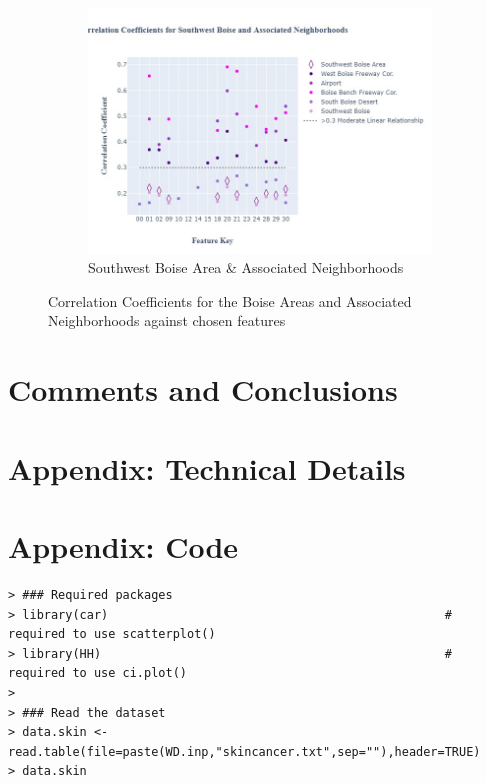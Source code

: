 \documentclass{article}
\begin{document}
\begin{figure}[H]
\begin{subfigure}[b]{0.45\textwidth}
         \includegraphics[width=\textwidth]{SW_fig.jpg}
         \caption{Southwest Boise Area \& Associated Neighborhoods}
         \label{fig: sw_ccg}
     \end{subfigure}
        \caption{Correlation Coefficients for the Boise Areas and Associated Neighborhoods against chosen features}
        \label{fig: all_ccg}
\end{figure}


\section{Comments and Conclusions}



\appendix
\section{Appendix: Technical Details}



\section{Appendix: Code}

{\footnotesize
\begin{verbatim}
> ### Required packages
> library(car)                                               # required to use scatterplot()
> library(HH)                                                # required to use ci.plot()
>
> ### Read the dataset
> data.skin <- read.table(file=paste(WD.inp,"skincancer.txt",sep=""),header=TRUE)
> data.skin
\end{verbatim}
}
\end{document}
